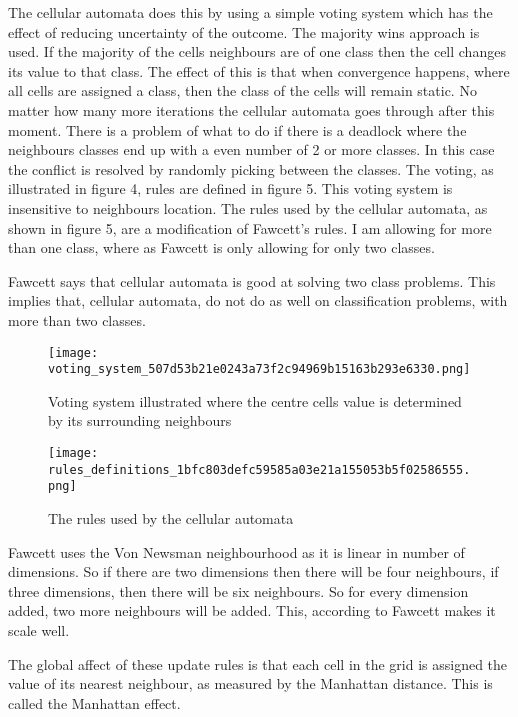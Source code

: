 \documentclass[11pt]{article}
\begin{document}
The cellular automata does this by using a simple voting system which
has the effect of reducing uncertainty of the outcome. The majority
wins approach is used.  If the majority of the cells neighbours
are of one class then the cell changes its value to that class.  The
effect of this is that when convergence happens, where all cells are
assigned a class, then the class of the cells will remain static.  No
matter how many more iterations the cellular automata goes through
after this moment. There is a problem of what to do if there is a
deadlock where the neighbours classes end up with a even number of 2
or more classes.  In this case the conflict is resolved by randomly
picking between the classes. The voting, as illustrated in figure 4, rules are
defined in figure 5. This voting system is insensitive to neighbours
location. The rules used by the cellular automata, as shown in figure
5, are a modification of Fawcett's \cite{fawcett08} rules.  I
am allowing for more than one class, where as Fawcett \cite{fawcett08}
is only allowing for only two classes.  

Fawcett \cite{fawcett08} says that cellular automata is good at
solving two class problems. This implies that, cellular automata, do
not do as well on classification problems, with more than two classes. 

\begin{figure}[htb]
\centering
\texttt{[image: voting\_system\_507d53b21e0243a73f2c94969b15163b293e6330.png]}
\caption{Voting system illustrated where the centre cells value is determined by its surrounding neighbours}
\end{figure}


\begin{figure}[htb]
\centering
\texttt{[image: rules\_definitions\_1bfc803defc59585a03e21a155053b5f02586555.png]}
\caption{The rules used by the cellular automata}
\end{figure}



Fawcett \cite{fawcett08} uses the Von Newsman neighbourhood as it is
linear in number of dimensions. So if there are two dimensions then
there will be four neighbours,  if three dimensions, then there will
be six neighbours.  So for every dimension added, two more neighbours
will be added.  This, according to Fawcett \cite{fawcett08} makes it
scale well.

The global affect of these update rules is that each cell in the grid
is assigned the value of its nearest neighbour, as measured by the
Manhattan distance.  This is called the Manhattan effect.
\end{document}
